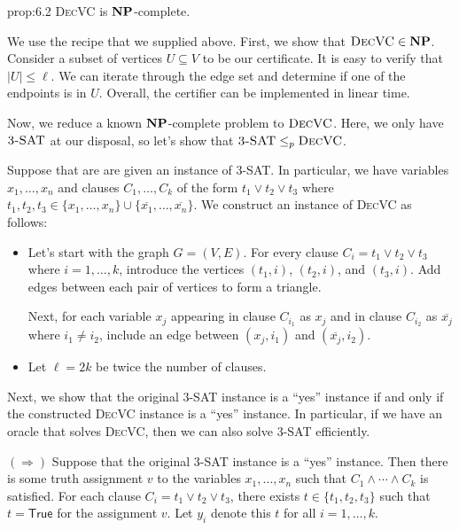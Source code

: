 \begin{prop}{prop:6.2}
    \textsc{DecVC} is $\mathbf{NP}$-complete.
\end{prop}\vspace{-0.25cm}
\begin{pf}
    We use the recipe that we supplied above. First, we show 
    that $\textsc{DecVC} \in \mathbf{NP}$. Consider a subset of vertices $U \subseteq V$ 
    to be our certificate. It is easy to verify that $|U| \leq \ell$. We can 
    iterate through the edge set and determine if one of the endpoints 
    is in $U$. Overall, the certifier can be implemented in linear time. 
    
    Now, we reduce a known $\mathbf{NP}$-complete problem to $\textsc{DecVC}$. 
    Here, we only have $\textsc{3-SAT}$ at our disposal, so let's show that 
    $\textsc{3-SAT} \leq_p \textsc{DecVC}$. 

    Suppose that are are given an instance of \textsc{3-SAT}. In particular, 
    we have variables $x_1, \dots, x_n$ and clauses $C_1, \dots, C_k$ 
    of the form $t_1 \vee t_2 \vee t_3$ where $t_1, t_2, t_3 \in 
    \{x_1, \dots, x_n\} \cup \{\overline{x_1}, \dots, \overline{x_n}\}$. 
    We construct an instance of \textsc{DecVC} as follows:
    \begin{itemize}
        \item Let's start with the graph $G = (V, E)$. For every clause 
        $C_i = t_1 \vee t_2 \vee t_3$ where $i = 1, \dots, k$, introduce the 
        vertices $(t_1, i)$, $(t_2, i)$, and $(t_3, i)$. Add edges between 
        each pair of vertices to form a triangle. 

        Next, for each variable $x_j$ appearing in clause $C_{i_1}$ as $x_j$
        and in clause $C_{i_2}$ as $\overline{x_j}$ where $i_1 \neq i_2$, 
        include an edge between $(x_j, i_1)$ and $(\overline{x_j}, i_2)$.
        
        \item Let $\ell = 2k$ be twice the number of clauses.
    \end{itemize}
    Next, we show that the original \textsc{3-SAT} instance is a ``yes'' 
    instance if and only if the constructed \textsc{DecVC} instance 
    is a ``yes'' instance. In particular, if we have an oracle that 
    solves \textsc{DecVC}, then we can also solve \textsc{3-SAT} efficiently. 

    $(\Rightarrow)$ Suppose that the original \textsc{3-SAT} instance 
    is a ``yes'' instance. Then there is some truth assignment $v$ to 
    the variables $x_1, \dots, x_n$ such that $C_1 \wedge \cdots \wedge C_k$ 
    is satisfied. For each clause $C_i = t_1 \vee t_2 \vee t_3$, there exists 
    $t \in \{t_1, t_2, t_3\}$ such that $t = \textsf{True}$ for the assignment 
    $v$. Let $y_i$ denote this $t$ for all $i = 1, \dots, k$. 


\end{pf}
